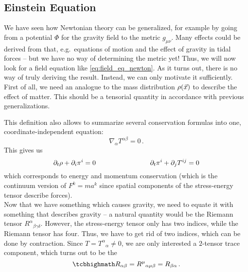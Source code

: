 	\subsection{Einstein Equation}
We have seen how Newtonian theory can be generalized, for example by going from a potential $\Phi$ for the gravity field to the metric $g_{\mu \nu}$. Many effects could be derived from that, e.g.~equations of motion and the effect of gravity in tidal forces -- but we have no way of determining the metric yet! Thus, we will now look for a field equation like \eqref{eq:field_eq_newton}. As it turns out, there is no way of truly deriving the result. Instead, we can only motivate it sufficiently.\\


First of all, we need an analogue to the mass distribution $\rho\qty(\vec{x})$ to describe the effect of matter. This should be a tensorial quantity in accordance with previous generalizations.


This definition also allows to summarize several conservation formulas into one, coordinate-independent equation:
\begin{equation}
\nabla_\alpha T^{\alpha \beta} = 0 \, .
\end{equation}
This gives us
\begin{equation}
\partial_t \rho + \partial_i \pi^i = 0 \qquad \qquad \qquad \qquad \partial_t \pi^i + \partial_j T^{i j} = 0
\end{equation}
which corresponds to energy and momentum conservation (which is the continuum version of $F^k = m a^k$ since spatial components of the stress-energy tensor describe forces).\\


Now that we have something which causes gravity, we need to equate it with something that describes gravity -- a natural quantity would be the Riemann tensor $R^\alpha{}_{\beta \gamma \delta}$. However, the stress-energy tensor only has two indices, while the Riemann tensor has four. Thus, we have to get rid of two indices, which can be done by contraction. Since $T = T^\alpha{}_\alpha \neq 0$, we are only interested a $2$-tensor trace component, which turns out to be the  
\begin{equation}
\eqbox{
R_{\alpha \beta} = R^\mu{}_{\alpha \mu \beta}
} = R_{\beta \alpha} \, .
\end{equation}

